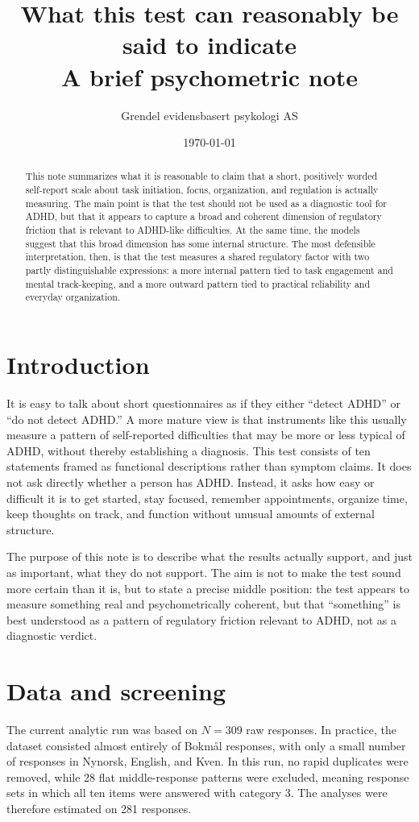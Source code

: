 \documentclass[11pt,a4paper]{article}
\title{What this test can reasonably be said to indicate\\
\large A brief psychometric note}
\author{Grendel evidensbasert psykologi AS}
\date{\today}
\begin{document}
\maketitle

\begin{abstract}
This note summarizes what it is reasonable to claim that a short, positively worded self-report scale about task initiation, focus, organization, and regulation is actually measuring. The main point is that the test should not be used as a diagnostic tool for ADHD, but that it appears to capture a broad and coherent dimension of regulatory friction that is relevant to ADHD-like difficulties. At the same time, the models suggest that this broad dimension has some internal structure. The most defensible interpretation, then, is that the test measures a shared regulatory factor with two partly distinguishable expressions: a more internal pattern tied to task engagement and mental track-keeping, and a more outward pattern tied to practical reliability and everyday organization.
\end{abstract}

\section{Introduction}
It is easy to talk about short questionnaires as if they either ``detect ADHD'' or ``do not detect ADHD.'' A more mature view is that instruments like this usually measure a pattern of self-reported difficulties that may be more or less typical of ADHD, without thereby establishing a diagnosis. This test consists of ten statements framed as functional descriptions rather than symptom claims. It does not ask directly whether a person has ADHD. Instead, it asks how easy or difficult it is to get started, stay focused, remember appointments, organize time, keep thoughts on track, and function without unusual amounts of external structure.

The purpose of this note is to describe what the results actually support, and just as important, what they do not support. The aim is not to make the test sound more certain than it is, but to state a precise middle position: the test appears to measure something real and psychometrically coherent, but that ``something'' is best understood as a pattern of regulatory friction relevant to ADHD, not as a diagnostic verdict.

\section{Data and screening}
The current analytic run was based on $N = 309$ raw responses. In practice, the dataset consisted almost entirely of Bokm\r{a}l responses, with only a small number of responses in Nynorsk, English, and Kven. In this run, no rapid duplicates were removed, while 28 flat middle-response patterns were excluded, meaning response sets in which all ten items were answered with category 3. The analyses were therefore estimated on 281 responses.
\end{document}
